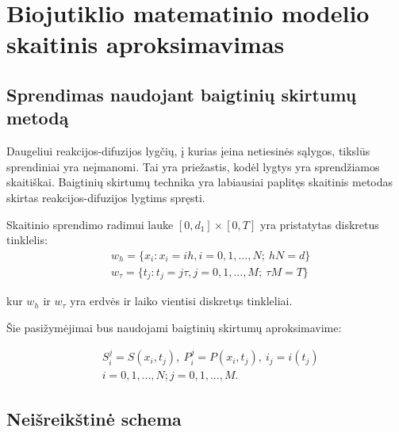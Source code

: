 \documentclass[12pt, a4paper, lithuanian]{article}
\begin{document}
\section{Biojutiklio matematinio modelio skaitinis aproksimavimas}
\subsection{Sprendimas naudojant baigtinių skirtumų metodą}

Daugeliui reakcijos-difuzijos lygčių, į kurias įeina netiesinės sąlygos,
tikslūs sprendiniai yra neįmanomi. Tai yra priežastis, kodėl lygtys yra
sprendžiamos skaitiškai. Baigtinių skirtumų technika yra labiausiai paplitęs
skaitinis metodas skirtas reakcijos-difuzijos lygtims spręsti\cite{baronas2009mathematical}.

Skaitinio sprendimo radimui lauke $[0,d_1]\times[0,T]$ yra pristatytas
diskretus tinklelis:
\begin{equation}
\begin{aligned}
    &w_h = \{x_i : x_i = ih, i = 0, 1, ..., N;\ hN = d\} \\
    &w_{\tau} = \{t_j : t_j = j \tau, j = 0, 1, ..., M;\ \tau M = T\}
\end{aligned}
\end{equation}

kur $w_h$ ir $w_{\tau}$ yra erdvės ir laiko vientisi diskretųs tinkleliai.

Šie pasižymėjimai bus naudojami baigtinių skirtumų aproksimavime:

\begin{equation}
    \begin{aligned}
        &S^j_i = S(x_i,t_j), \ P^j_i = P(x_i,t_j), \ i_j = i(t_j) \\ 
        &i = 0, 1, ..., N; j = 0, 1, ..., M.
    \end{aligned}
\end{equation}

\subsection{Neišreikštinė schema}
\end{document}

